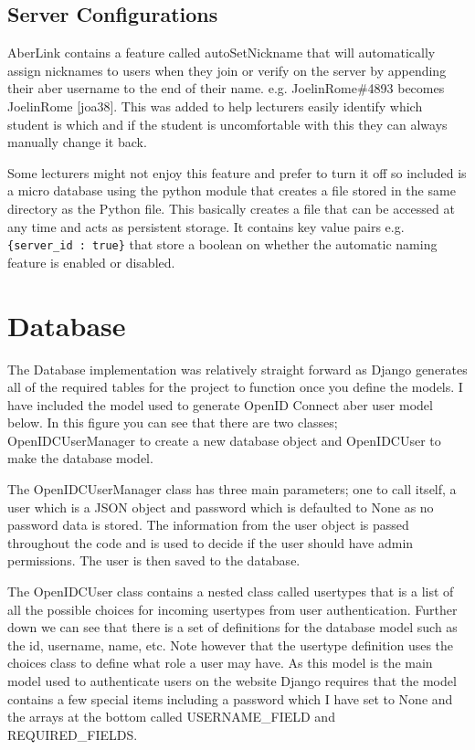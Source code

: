 \subsection{Server Configurations}\label{sec3:server-config}
AberLink contains a feature called autoSetNickname that will automatically assign nicknames to users when they join or verify on the server by appending their aber username to the end of their name. e.g. JoelinRome\#4893 becomes JoelinRome [joa38]. This was added to help lecturers easily identify which student is which and if the student is uncomfortable with this they can always manually change it back. 

Some lecturers might not enjoy this feature and prefer to turn it off so included is a micro database using the python module \cite{shelve} that creates a file stored in the same directory as the Python file. This basically creates a file that can be accessed at any time and acts as persistent storage. It contains key value pairs e.g. \verb|{server_id : true}| that store a boolean on whether the automatic naming feature is enabled or disabled. 

\section{Database}\label{sec3:database}
The Database implementation was relatively straight forward as Django \cite{Django} generates all of the required tables for the project to function once you define the models. I have included the model used to generate OpenID Connect \cite{OpenID} aber user model below. In this figure you can see that there are two classes; OpenIDCUserManager to create a new database object and OpenIDCUser to make the database model. 

The OpenIDCUserManager class has three main parameters; one to call itself, a user which is a JSON object and password which is defaulted to None as no password data is stored. The information from the user object is passed throughout the code and is used to decide if the user should have admin permissions. The user is then saved to the database.

The OpenIDCUser class contains a nested class called usertypes that is a list of all the possible choices for incoming usertypes from user authentication. Further down we can see that there is a set of definitions for the database model such as the id, username, name, etc. Note however that the usertype definition uses the choices class to define what role a user may have. As this model is the main model used to authenticate users on the website Django requires that the model contains a few special items including a password which I have set to None and the arrays at the bottom called USERNAME\_FIELD and REQUIRED\_FIELDS.

